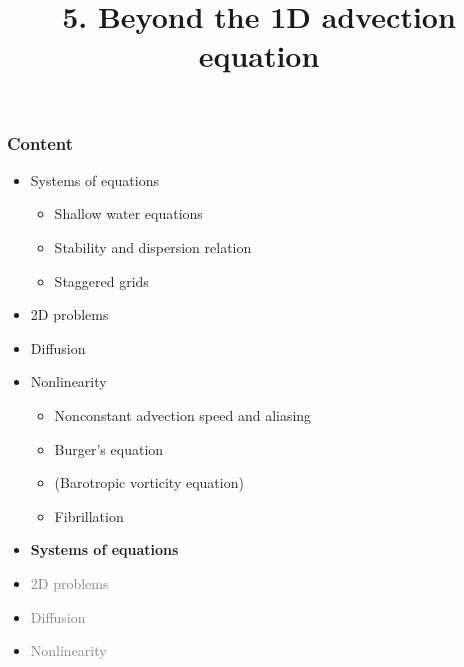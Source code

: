 \documentclass[aspectratio=43,9pt]{beamer}
\title{5. Beyond the 1D advection equation}%
\begin{document}
%
%
\begin{frame}[plain]
	\titlepage
\end{frame}
%
%
\begin{frame}
	\frametitle{Content}
	\begin{itemize}
		\item Systems of equations
			\begin{itemize}
				\item Shallow water equations
				\item Stability and dispersion relation
				\item Staggered grids
			\end{itemize}
		\item 2D problems
		\item Diffusion
		\item Nonlinearity
			\begin{itemize}
				\item Nonconstant advection speed and aliasing
				\item Burger's equation
				\item (Barotropic vorticity equation)
				\item Fibrillation
			\end{itemize}
	\end{itemize}
\end{frame}
%
%
\begin{frame}
	\begin{itemize}
		\item {\bfseries Systems of equations}
		\item \textcolor{gray}{2D problems}
		\item \textcolor{gray}{Diffusion}
		\item \textcolor{gray}{Nonlinearity}
	\end{itemize}
\end{frame}
%
%
\end{document}
